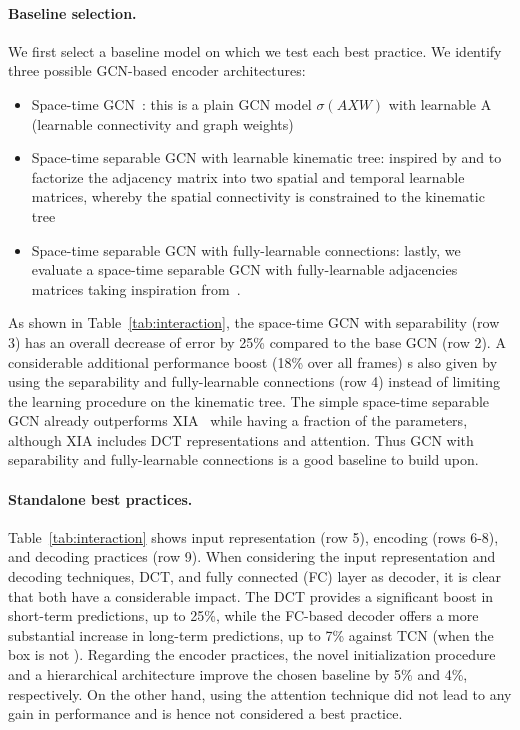 \documentclass[10pt,twocolumn,letterpaper]{article}
\newcommand{\cmark}{\ding{51}}
\begin{document}
\paragraph{Baseline selection.}
We first select a baseline model on which we test each best practice. We identify three possible GCN-based encoder architectures:
\begin{itemize}
    \item Space-time GCN~\cite{yan18}: this is a plain GCN model $\sigma(AXW)$ with learnable A (learnable connectivity and graph weights)
    \item Space-time separable GCN with learnable kinematic tree: inspired by \cite{yan18} and \cite{sofianos21} to factorize the adjacency matrix into two spatial and temporal learnable matrices, whereby the spatial connectivity is constrained to the kinematic tree
    \item Space-time separable GCN with fully-learnable connections: lastly, we evaluate a space-time separable GCN with fully-learnable adjacencies matrices taking inspiration from~\cite{sofianos21}. 
\end{itemize}

As shown in Table~\ref{tab:interaction}, the space-time GCN with separability (row 3) has an overall decrease of error by 25\% compared to the base GCN (row 2). A considerable additional performance boost (18\% over all frames) s also given by using the separability and fully-learnable connections (row 4) instead of limiting the learning procedure on the kinematic tree. The simple space-time separable GCN already outperforms XIA~\cite{guo21} while having a fraction of the parameters, although XIA includes DCT representations and attention. Thus GCN with separability and fully-learnable connections is a good baseline to build upon.


\paragraph{Standalone best practices.}
Table~\ref{tab:interaction} shows input representation (row 5), encoding (rows 6-8), and decoding practices (row 9). When considering the input representation and decoding techniques, DCT, and fully connected (FC) layer as decoder, it is clear that both have a considerable impact. The DCT provides a significant boost in short-term predictions, up to 25\%, while the FC-based decoder offers a more substantial increase in long-term predictions, up to 7\% against TCN (when the box is not \cmark ). Regarding the encoder practices, the novel initialization procedure and a hierarchical architecture improve the chosen baseline by 5\% and 4\%, respectively. On the other hand, using the attention technique did not lead to any gain in performance and is hence not considered a best practice.
\end{document}
